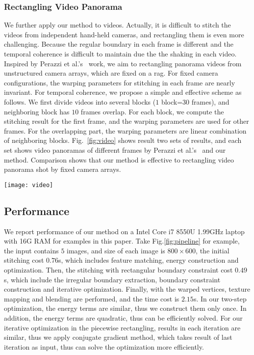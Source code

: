 \documentclass[10pt,journal,compsoc]{IEEEtran}
\begin{document}
\subsubsection{Rectangling Video Panorama}

We further apply our method to videos.
Actually, it is difficult to stitch the videos from independent hand-held cameras, and rectangling them is even more challenging.
Because the regular boundary in each frame is different and the temporal coherence is difficult to maintain due the the shaking in each video.
Inspired by Perazzi et al.'s~\cite{journals/cgf/PerazziSZKWWG15} work, we aim to rectangling panorama videos from unstructured camera arrays, which are fixed on a rag.
For fixed camera configurations,  the warping parameters for stitching in each frame are nearly invariant.
For temporal coherence, we propose a simple and effective scheme as follows.
We first divide videos into several blocks ($1$ block=$30$ frames), and neighboring block has $10$ frames overlap.
For each block, we compute the stitching result for the first frame, and the warping parameters are used for other frames.
For the overlapping part, the warping parameters are linear combination of neighboring blocks.
Fig.~\ref{fig:video} shows result two sets of results, and each set shows video panoramas of different frames by Perazzi et al.'s~\cite{journals/cgf/PerazziSZKWWG15} and our method.
Comparison shows that our method is effective to rectangling video panorama shot by fixed camera arrays.

 \begin{figure*} %
  \centering
  \texttt{[image: video]}
  \caption{Application of rectangling video panorama. We give two examples, and each example shows stitching results of $4$ different frames using Perazzi et al.'s~\cite{journals/cgf/PerazziSZKWWG15} method and our rectangling respectively.} \label{fig:video}
\end{figure*}

 \subsection{Performance}
We report performance of our method on a Intel Core i7 8550U 1.99GHz laptop with 16G RAM for examples in this paper. Take Fig.\ref{fig:pipeline} for example, the input contains $5$ images, and size of each image is $800\times600$, the initial stitching cost $0.76$s, which includes feature matching, energy construction and optimization.
Then, the stitching with rectangular boundary constraint cost $0.49$s, which include the irregular boundary extraction, boundary constraint construction and iterative optimization. Finally, with the warped vertices, texture mapping and blending are performed, and the time cost is $2.15$s.
In our two-step optimization, the energy terms are similar, thus we construct them only once. In addition, the energy terms are quadratic, thus can be efficiently solved.
For our iterative optimization in the piecewise rectangling, results in each iteration are similar, thus we apply conjugate gradient method, which takes result of last iteration as input, thus can solve the optimization more efficiently.
\end{document}
